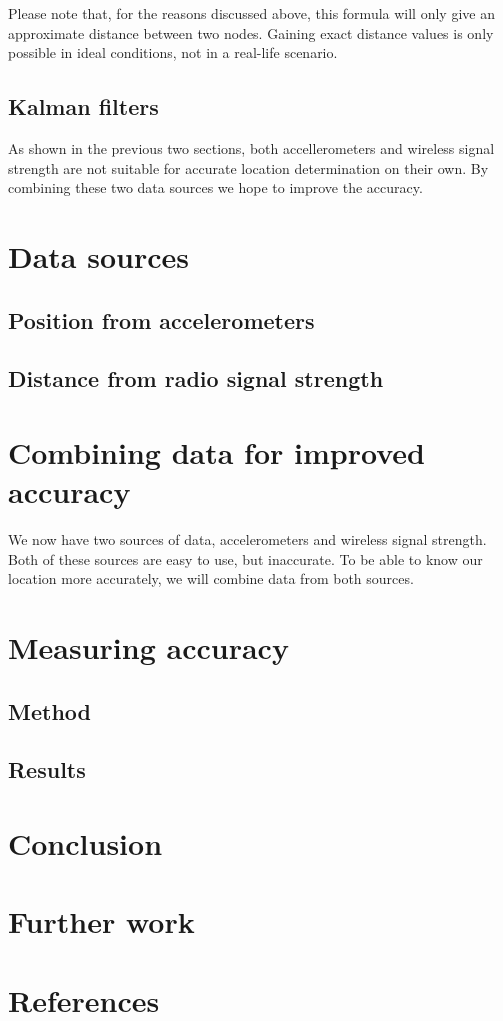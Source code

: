 \documentclass[twoside, 11pt]{uva-bachelor-thesis}
\begin{document}
Please note that, for the reasons discussed above, this formula will only give an approximate distance between two nodes. Gaining exact distance values is only possible in ideal conditions, not in a real-life scenario.

\section{Kalman filters}
As shown in the previous two sections, both accellerometers and wireless signal strength are not suitable for accurate location determination on their own. By combining these two data sources we hope to improve the accuracy.
\chapter{Data sources}
  \section{Position from accelerometers}
  

  
  \section{Distance from radio signal strength}
  
\chapter{Combining data for improved accuracy}
We now have two sources of data, accelerometers and wireless signal strength. Both of these sources are easy to use, but inaccurate. To be able to know our location more accurately, we will combine data from both sources. 
\chapter{Measuring accuracy}

  \section{Method}
  \section{Results}

\chapter{Conclusion}

\chapter{Further work}



\chapter{References}
\end{document}
